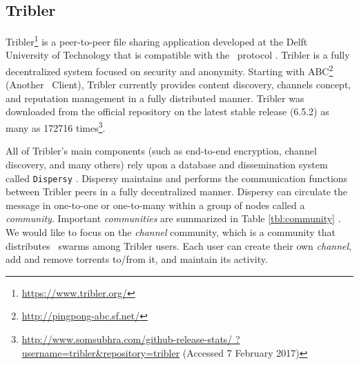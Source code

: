 \subsection{Tribler}
\label{section:tribler}
Tribler\footnote{\url{https://www.tribler.org/}} is a peer-to-peer file sharing application developed at the Delft University of Technology that is compatible with the \bt~protocol \cite{2008:tribler:pouwelse}. Tribler is a fully decentralized system focused on security and anonymity. Starting with ABC\footnote{\url{http://pingpong-abc.sf.net/}} (Another \bt~Client), Tribler currently provides content discovery, channels concept, and reputation management in a fully distributed manner. Tribler was downloaded from the official repository on the latest stable release (6.5.2) as many as 172716 times\footnote{\url{http://www.somsubhra.com/github-release-stats/ ?username=tribler&repository=tribler} (Accessed 7 February 2017)}.

All of Tribler's main components (such as end-to-end encryption, channel discovery, and many others) rely upon a database and dissemination system called \texttt{Dispersy} \cite{2013:dispersy:zeilemaker}. Dispersy maintains and performs the communication functions between Tribler peers in a fully decentralized manner. Dispersy can circulate the message in one-to-one or one-to-many within a group of nodes called a \textit{community}. Important \textit{communities} are summarized in Table \ref{tbl:community} \cite{2016:tribler-techdebt:vos}. We would like to focus on the \textit{channel} community, which is a community that distributes \bt~swarms among Tribler users. Each user can create their own \textit{channel}, add and remove torrents to/from it, and maintain its activity. 


